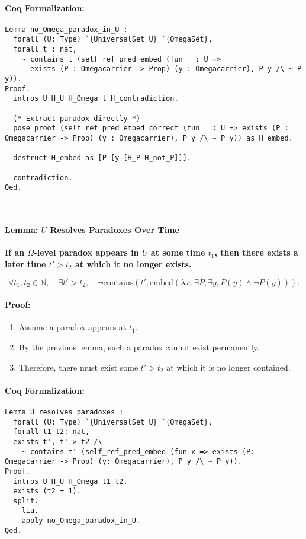 \documentclass[12pt]{article}
\begin{document}
\paragraph{Coq Formalization:}
\begin{lstlisting}[language=Coq]
Lemma no_Omega_paradox_in_U :
  forall (U: Type) `{UniversalSet U} `{OmegaSet},
  forall t : nat,
    ~ contains t (self_ref_pred_embed (fun _ : U =>
      exists (P : Omegacarrier -> Prop) (y : Omegacarrier), P y /\ ~ P y)).
Proof.
  intros U H_U H_Omega t H_contradiction.

  (* Extract paradox directly *)
  pose proof (self_ref_pred_embed_correct (fun _ : U => exists (P : Omegacarrier -> Prop) (y : Omegacarrier), P y /\ ~ P y)) as H_embed.
  
  destruct H_embed as [P [y [H_P H_not_P]]].
  
  contradiction.
Qed.
\end{lstlisting}

---

\paragraph{Lemma: \( U \) Resolves Paradoxes Over Time}
\textbf{If an \( \Omega \)-level paradox appears in \( U \) at some time \( t_1 \), then there exists a later time \( t' > t_2 \) at which it no longer exists.}

\begin{equation}
    \forall t_1, t_2 \in \mathbb{N}, \quad
    \exists t' > t_2, \quad \neg \text{contains}(t', \text{embed}(\lambda x.\ \exists P, \exists y, P(y) \wedge \neg P(y))).
\end{equation}

\paragraph{Proof:}
\begin{enumerate}
    \item Assume a paradox appears at \( t_1 \).
    \item By the previous lemma, such a paradox cannot exist permanently.
    \item Therefore, there must exist some \( t' > t_2 \) at which it is no longer contained.
\end{enumerate}

\paragraph{Coq Formalization:}
\begin{lstlisting}[language=Coq]
Lemma U_resolves_paradoxes : 
  forall (U: Type) `{UniversalSet U} `{OmegaSet},
  forall t1 t2: nat, 
  exists t', t' > t2 /\ 
    ~ contains t' (self_ref_pred_embed (fun x => exists (P: Omegacarrier -> Prop) (y: Omegacarrier), P y /\ ~ P y)).
Proof.
  intros U H_U H_Omega t1 t2.
  exists (t2 + 1).
  split.
  - lia.
  - apply no_Omega_paradox_in_U.
Qed.
\end{lstlisting}
\end{document}
